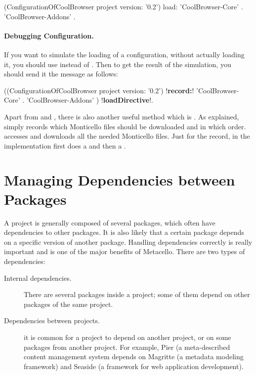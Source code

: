 \documentclass[a4paper,10pt,twoside]{book}
\begin{document}
\begin{code}{}
  (ConfigurationOfCoolBrowser project version: '0.2') load: 
  		{ 'CoolBrowser-Core' . 
  		'CoolBrowser-Addons' }.
\end{code}


\paragraph{Debugging Configuration.}
If you want to simulate the loading of a configuration, without actually loading it, you should use  instead of . Then to get the result of the simulation, you should send it the message  as follows:

\begin{code}{}
  ((ConfigurationOfCoolBrowser project version: '0.2') !\textbf{record:}! 
  		{ 'CoolBrowser-Core' .
		'CoolBrowser-Addons' }) !\textbf{loadDirective}!.
\end{code} 

Apart from  and , there is also another useful method  which is . As explained,  simply records which Monticello files should be downloaded and in which order.   accesses and downloads all the needed Monticello files. Just for the record, in the implementation  first does a  and then a . 

\section{Managing Dependencies between Packages}

A project is generally composed of several packages, which often have dependencies to other packages.  It is also likely that a certain package depends on a specific version of another package. Handling dependencies correctly is really important and  is one of the major benefits of Metacello. There are two types of dependencies:
\begin{description}
\item[Internal dependencies.] There are several packages inside a project; some of them depend on other packages of the same project. 
\item[Dependencies between projects.] it is common for a project to depend on another project, or on some packages from another project. 
For example, Pier (a meta-described content management system depends on Magritte (a metadata modeling framework) and Seaside (a framework for web application development).
\end{description}
\end{document}
